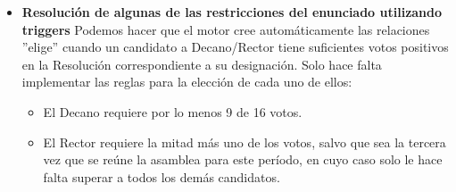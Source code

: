 \begin{itemize}
\item \textbf{Resolución de algunas de las restricciones del enunciado utilizando triggers}
Podemos hacer que el motor cree automáticamente las relaciones ''elige'' cuando un candidato a Decano/Rector tiene suficientes votos positivos en la Resolución correspondiente a su designación. Solo hace falta implementar las reglas para la elección de cada uno de ellos:
  \begin{itemize}
  \item El Decano requiere por lo menos 9 de 16 votos.
  \item El Rector requiere la mitad más uno de los votos, salvo que sea la tercera vez que se reúne la asamblea para este período, en cuyo caso solo le hace falta superar a todos los demás candidatos.
  \end{itemize}
\end{itemize}





